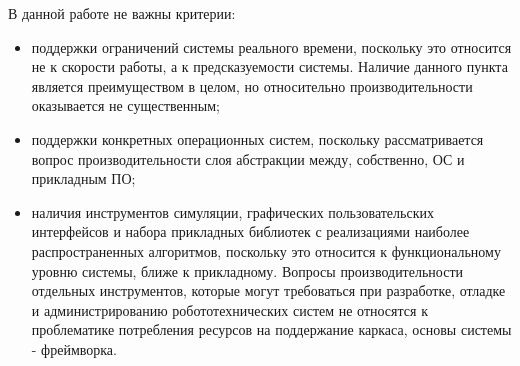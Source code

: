 В данной работе не важны критерии:
\begin{itemize}[noitemsep]
	\item поддержки ограничений системы реального времени, поскольку это относится не к скорости работы, а к предсказуемости системы. Наличие данного пункта является преимуществом в целом, но относительно производительности оказывается не существенным;
	\item поддержки конкретных операционных систем, поскольку рассматривается вопрос производительности слоя абстракции между, собственно, ОС и прикладным ПО;
	\item наличия инструментов симуляции, графических пользовательских интерфейсов и набора прикладных библиотек с реализациями наиболее распространенных алгоритмов, поскольку это относится к функциональному уровню системы, ближе к прикладному. Вопросы производительности отдельных инструментов, которые могут требоваться при разработке, отладке и администрированию робототехнических систем не относятся к проблематике потребления ресурсов на поддержание каркаса, основы системы - фреймворка.
\end{itemize}
